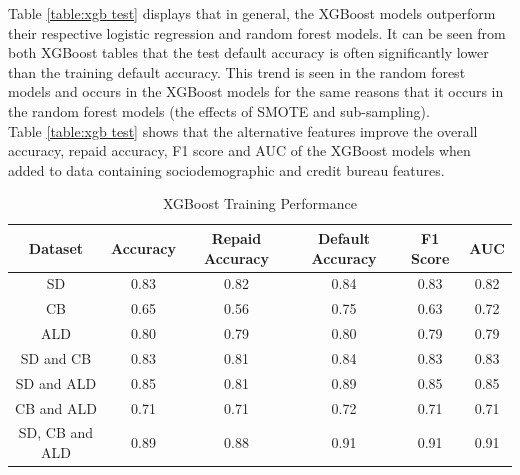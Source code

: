 Table \ref{table:xgb test} displays that in general, the XGBoost models outperform their respective logistic regression and random forest models. It can be seen from both XGBoost tables that the test default accuracy is often significantly lower than the training default accuracy. This trend is seen in the random forest models and occurs in the XGBoost models for the same reasons that it occurs in the random forest models (the effects of SMOTE and sub-sampling). \\ 

Table \ref{table:xgb test} shows that the alternative features improve the overall accuracy, repaid accuracy, F1 score and AUC of the XGBoost models when added to data containing sociodemographic and credit bureau features. 

\vspace{10pt}

\begin{table}[H]
\begin{center}
\begin{tabular}{|c|c|c|c|c|c|} 
\hline
\multicolumn{1}{|c|}{Dataset}
&\multicolumn{1}{|c|}{Accuracy}
&\multicolumn{1}{|c|}{Repaid Accuracy}
&\multicolumn{1}{|c|}{Default Accuracy}
&\multicolumn{1}{|c|}{F1 Score}
&\multicolumn{1}{|c|}{AUC}\\
\hline
SD & 0.83 & 0.82 & 0.84 & 0.83 & 0.82    \\
\hline
CB & 0.65 & 0.56 & 0.75 & 0.63 & 0.72    \\
\hline
ALD & 0.80 & 0.79 & 0.80 & 0.79 & 0.79    \\
\hline
SD and CB & 0.83 & 0.81 & 0.84 & 0.83 & 0.83    \\
\hline
SD and ALD & 0.85 & 0.81 & 0.89 & 0.85 & 0.85    \\
\hline
CB and ALD & 0.71 & 0.71 & 0.72 & 0.71& 0.71    \\
\hline
SD, CB and ALD & 0.89 & 0.88 & 0.91 & 0.91 & 0.91    \\
\hline
\end{tabular}
\end{center}
\caption{XGBoost Training Performance}
\label{table:xgb training}
\end{table}

\vspace{10pt}

